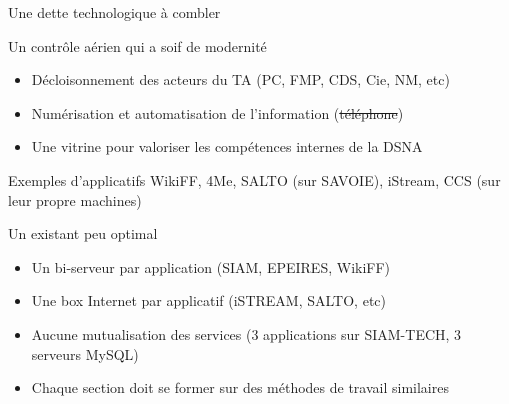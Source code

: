 \begin{frame}{Une dette technologique à combler}
\begin{block}{Un contrôle aérien qui a soif de modernité}
\begin{itemize}
    \item Décloisonnement des acteurs du TA (PC, FMP, CDS, Cie, NM, etc) \pause
    \item Numérisation et automatisation de l'information (\sout{téléphone})
    \item Une vitrine pour valoriser les compétences internes de la DSNA 
\end{itemize}
\end{block} 
 \begin{exampleblock}{Exemples d'applicatifs}
 WikiFF, 4Me, SALTO (sur SAVOIE), iStream, CCS (sur leur propre machines)
\end{exampleblock}
\begin{block}{Un existant peu optimal}
\begin{itemize}
\item Un bi-serveur par application (SIAM, EPEIRES, WikiFF)
\item Une box Internet par applicatif (iSTREAM, SALTO, etc)
\item Aucune mutualisation des services (3 applications sur SIAM-TECH, 3 serveurs MySQL)
\item Chaque section doit se former sur des méthodes de travail similaires 
\end{itemize}
\end{block}
\end{frame}

